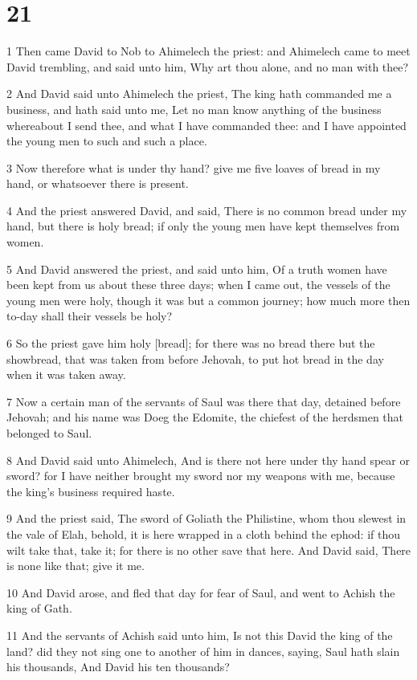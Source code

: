 \chapter{21}

\par 1 Then came David to Nob to Ahimelech the priest: and Ahimelech came to meet David trembling, and said unto him, Why art thou alone, and no man with thee?
\par 2 And David said unto Ahimelech the priest, The king hath commanded me a business, and hath said unto me, Let no man know anything of the business whereabout I send thee, and what I have commanded thee: and I have appointed the young men to such and such a place.
\par 3 Now therefore what is under thy hand? give me five loaves of bread in my hand, or whatsoever there is present.
\par 4 And the priest answered David, and said, There is no common bread under my hand, but there is holy bread; if only the young men have kept themselves from women.
\par 5 And David answered the priest, and said unto him, Of a truth women have been kept from us about these three days; when I came out, the vessels of the young men were holy, though it was but a common journey; how much more then to-day shall their vessels be holy?
\par 6 So the priest gave him holy [bread]; for there was no bread there but the showbread, that was taken from before Jehovah, to put hot bread in the day when it was taken away.
\par 7 Now a certain man of the servants of Saul was there that day, detained before Jehovah; and his name was Doeg the Edomite, the chiefest of the herdsmen that belonged to Saul.
\par 8 And David said unto Ahimelech, And is there not here under thy hand spear or sword? for I have neither brought my sword nor my weapons with me, because the king's business required haste.
\par 9 And the priest said, The sword of Goliath the Philistine, whom thou slewest in the vale of Elah, behold, it is here wrapped in a cloth behind the ephod: if thou wilt take that, take it; for there is no other save that here. And David said, There is none like that; give it me.
\par 10 And David arose, and fled that day for fear of Saul, and went to Achish the king of Gath.
\par 11 And the servants of Achish said unto him, Is not this David the king of the land? did they not sing one to another of him in dances, saying, Saul hath slain his thousands, And David his ten thousands?
